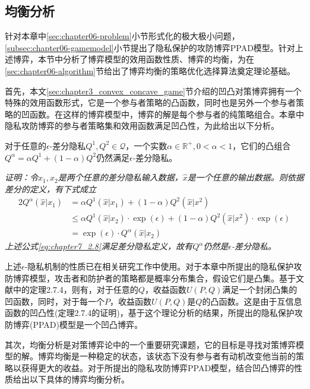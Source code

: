 \subsection{均衡分析}\label{subsec:chapter06-game-analysis}
针对本章中\ref{sec:chapter06-problem}小节形式化的极大极小问题，\ref{subsec:chapter06-gamemodel}小节提出了隐私保护的攻防博弈PPAD模型。针对上述博弈，本节中分析了博弈模型的效用函数性质、博弈的均衡，为在\ref{sec:chapter06-algorithm}节给出了博弈均衡的策略优化选择算法奠定理论基础。

首先，本文\ref{sec:chapter3_convex_concave_game}节介绍的凹凸对策博弈拥有一个特殊的效用函数形式，它是一个参与者策略的凸函数，同时也是另外一个参与者策略的凹函数\cite{washburn2014two}。在这样的博弈模型中，博弈的解是每个参与者的纯策略组合。本章中隐私攻防博弈的参与者策略集和效用函数满足凹凸性，为此给出以下分析。

\begin{lemma}\label{lem:chapter7_lemma01}对于任意的$\epsilon$-差分隐私$Q^1,Q^2 \in \mathcal{Q}$，一个实数$\alpha \in \mathbb{R}^+,0<\alpha<1$，它们的凸组合$Q^{\alpha}=\alpha Q^1+(1-\alpha)Q^2$仍然满足$\epsilon$-差分隐私。
\end{lemma}

{\em 证明：令$x_1,x_2$是两个任意的差分隐私输入数据，$\hat{x}$是一个任意的输出数据。则依据差分的定义，有下式成立
	\begin{alignat}{2}
	Q^{\alpha}(\hat{x}|x_1) & = \alpha Q^1(\hat{x}|x_1)+(1-\alpha)Q^2(\hat{x}|x^2)\\
	& \leq \alpha Q^1(\hat{x}|x_2)\cdot \exp(\epsilon)+(1-\alpha)Q^2(\hat{x}|x^2)\cdot \exp(\epsilon)\\
	& = \exp(\epsilon)\cdot Q^{\alpha}(\hat{x}|x_2) \label{eq:chapter7_2.8}
	\end{alignat}
上述公式\ref{eq:chapter7_2.8}满足差分隐私定义，故有$Q^\alpha$仍然是$\epsilon$-差分隐私。
}


上述$\epsilon$-隐私机制的性质已在相关研究工作中使用\cite{kalantari2018robust}。对于本章中所提出的隐私保护攻防博弈模型，攻击者和防护者的策略都是概率分布集合，假设它们是凸集。基于文献中的定理2.7.4，则有，对于任意的$Q$，收益函数$U(P,Q)$满足一个封闭凸集的凹函数，同时，对于每一个$P$，收益函数$U(P,Q)$是$Q$的凸函数。这是由于互信息函数的凹凸性(定理2.7.4\cite{cover2006elements}的证明)，基于这个理论分析的结果，所提出的隐私保护攻防博弈(PPAD)模型是一个凹凸博弈。


其次，均衡分析是对策博弈论中的一个重要研究课题，它的目标是寻找对策博弈模型的解。博弈均衡\cite{Neumann1944The}是一种稳定的状态，该状态下没有参与者有动机改变他当前的策略以获得更大的收益。对于所提出的隐私攻防博弈PPAD模型，结合凹凸博弈的性质给出以下具体的博弈均衡分析。

